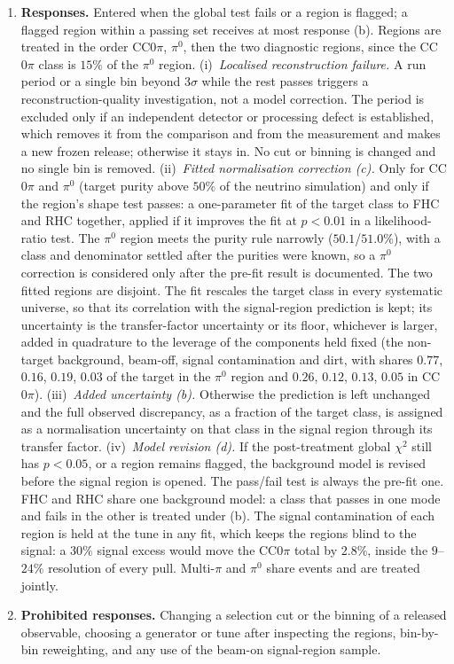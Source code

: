 \documentclass[11pt,a4paper]{article}
\begin{document}
\begin{enumerate}
    region.
  \item \textbf{Responses.} Entered when the global test fails or a region is flagged; a flagged region
    within a passing set receives at most response (b). Regions are treated in the order CC$0\pi$,
    $\pi^0$, then the two diagnostic regions, since the CC$0\pi$ class is $15\%$ of the $\pi^0$ region.
    (i)~\emph{Localised reconstruction failure.} A run period or a single bin beyond $3\sigma$ while the
    rest passes triggers a reconstruction-quality investigation, not a model correction. The period is
    excluded only if an independent detector or processing defect is established, which removes it from
    the comparison and from the measurement and makes a new frozen release; otherwise it stays in. No cut
    or binning is changed and no single bin is removed.
    (ii)~\emph{Fitted normalisation correction (c).} Only for CC$0\pi$ and $\pi^0$ (target purity above
    $50\%$ of the neutrino simulation) and only if the region's shape test passes: a one-parameter fit of
    the target class to FHC and RHC together, applied if it improves the fit at $p<0.01$ in a
    likelihood-ratio test. The $\pi^0$ region meets the purity rule narrowly ($50.1$/$51.0\%$), with a
    class and denominator settled after the purities were known, so a $\pi^0$ correction is considered only
    after the pre-fit result is documented. The two fitted regions are disjoint. The fit rescales the
    target class in every systematic universe, so that its correlation with the signal-region prediction
    is kept; its uncertainty is the transfer-factor uncertainty or its floor, whichever is larger, added in
    quadrature to the leverage of the components held fixed (the non-target background, beam-off, signal
    contamination and dirt, with shares $0.77$, $0.16$, $0.19$, $0.03$ of the target in the $\pi^0$ region and
    $0.26$, $0.12$, $0.13$, $0.05$ in CC$0\pi$).
    (iii)~\emph{Added uncertainty (b).} Otherwise the prediction is left unchanged and the full observed
    discrepancy, as a fraction of the target class, is assigned as a normalisation uncertainty on that
    class in the signal region through its transfer factor.
    (iv)~\emph{Model revision (d).} If the post-treatment global $\chi^2$ still has $p<0.05$, or a region
    remains flagged, the background model is revised before the signal region is opened. The pass/fail
    test is always the pre-fit one.
    FHC and RHC share one background model: a class that passes in one mode and fails in the other is
    treated under (b). The signal contamination of each region is held at the tune in any fit, which keeps
    the regions blind to the signal: a $30\%$ signal excess would move the CC$0\pi$ total by $2.8\%$, inside
    the $9$--$24\%$ resolution of every pull. Multi-$\pi$ and $\pi^0$ share events and are treated jointly.
  \item \textbf{Prohibited responses.} Changing a selection cut or the binning of a released observable,
    choosing a generator or tune after inspecting the regions, bin-by-bin reweighting, and any use of the
    beam-on signal-region sample.
\end{enumerate}
\end{document}
